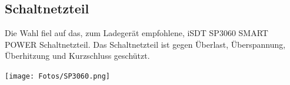 \subsection{Schaltnetzteil}
Die Wahl fiel auf das, zum Ladegerät empfohlene, \glqq iSDT SP3060 SMART POWER Schaltnetzteil\grqq.
Das Schaltnetzteil ist gegen Überlast, Überspannung, Überhitzung und Kurzschluss geschützt. 

\begin{minipage}{13cm}
    \centering
    \texttt{[image: Fotos/SP3060.png]}
\end{minipage}

\newpage


